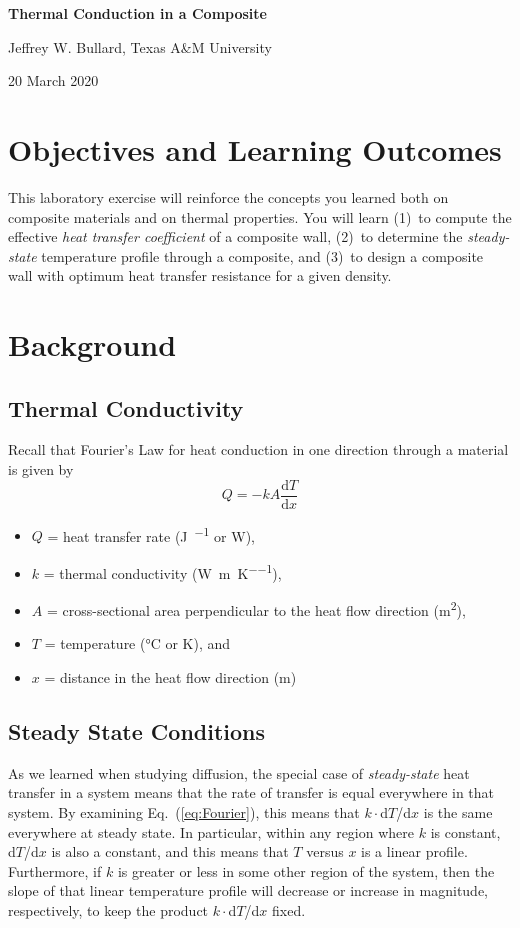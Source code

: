 \documentclass{article}
\newcommand{\oderiv}[2]{\ensuremath{\frac{\text{d}#1}{\text{d}#2}}}
\begin{document}
\allsectionsfont{\normalfont\sffamily\bfseries}
\begin{center}
    \Large{\textsf{\textbf{Thermal Conduction in a Composite}}}

    \textcopyright Jeffrey W. Bullard, Texas A\&M University

    20 March 2020
\end{center}

\vspace{0.25truein}
\section*{Objectives and Learning Outcomes}
This laboratory exercise will reinforce the concepts you learned both on composite
materials and on thermal properties.  You will learn (1)~to compute the effective
\textit{heat transfer coefficient} of a composite wall, (2)~to determine the
\textit{steady-state} temperature profile through a composite, and (3)~to design
a composite wall with optimum heat transfer resistance for a given density.

\section*{Background}
\subsection*{Thermal Conductivity}
Recall that Fourier's Law for heat conduction
in one direction through a material is given by
\begin{equation}
    Q = -k A \oderiv{T}{x}
    \label{eq:Fourier}
\end{equation}
\begin{itemize}
    \item $Q$ = heat transfer rate (\si{\joule\per\sec} or \si{\watt}),
    \item $k$ = thermal conductivity (\si{\watt\per\meter\per\kelvin}),
    \item $A$ = cross-sectional area perpendicular to the heat flow direction (\si{\meter\squared}),
    \item $T$ = temperature (\si{\degreeCelsius} or \si{\kelvin}), and
    \item $x$ = distance in the heat flow direction (\si{\meter})
\end{itemize}

\subsection*{Steady State Conditions}
As we learned when studying diffusion, the special case of \textit{steady-state} heat transfer in 
a system means that the rate of transfer is equal everywhere in that system.
By examining Eq.~(\ref{eq:Fourier}), this means that $k\cdot$d$T$/d$x$ is the
same everywhere at steady state.  In particular, within any region where $k$ is
constant, d$T$/d$x$ is also a constant, and this means that $T$ versus $x$ is
a linear profile.  Furthermore, if $k$ is greater or less in some other region
of the system, then the slope of that linear temperature profile will decrease
or increase in magnitude, respectively, to keep the product $k\cdot$d$T$/d$x$ fixed.
\end{document}
